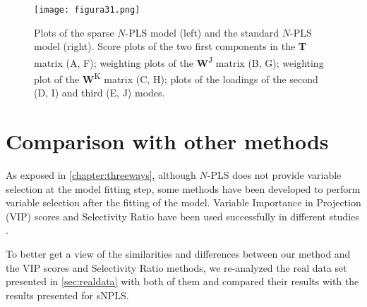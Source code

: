\begin{figure}[hbtp]
	\centering
\texttt{[image: figura31.png]}
\caption[Plots of the sparse $N$-PLS model and the standard \textit{N}-PLS model]{Plots of the sparse $N$-PLS model (left) and the standard $N$-PLS model (right). Score plots of the two first components in the \textbf{T} matrix (A, F); weighting plots of the \textbf{W}\textsuperscript{J} matrix (B, G); weighting plot of the \textbf{W}\textsuperscript{K} matrix (C, H); plots of the loadings of the second (D, I) and third (E, J) modes.}
\label{figura31}
\end{figure}

\section{Comparison with other methods}
As exposed in \autoref{chapter:threeways}, although $N$-PLS does not provide variable selection at the model fitting step, some methods have been developed to perform variable selection after the fitting of the model. Variable Importance in Projection (VIP) scores \parencite{favilla2013assessing} and Selectivity Ratio \parencite{rajalahti2009biomarker} have been used successfully in different studies \parencite{favilla2014ranking, mostafapour2015n, yun2016variable}.

To better get a view of the similarities and differences between our method and the VIP scores and Selectivity Ratio methods, we re-analyzed the real data set presented in \autoref{sec:realdata} with both of them and compared their results with the results presented for sNPLS.
